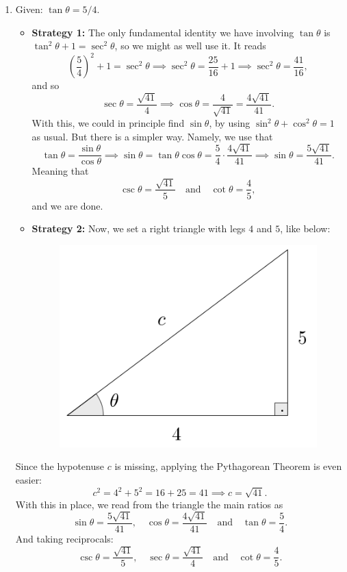 \documentclass{ximera}
\begin{document}
\begin{example}
\begin{enumerate}[label=\alph*.]
  \item Given: $\tan\theta = 5/4$.

    \begin{explanation}
      \begin{itemize}
      \item {\bf Strategy 1:} The only fundamental identity we have involving $\tan\theta$ is $\tan^2\theta+1=\sec^2\theta$, so we might as well use it. It reads $$\left(\frac{5}{4}\right)^2 + 1 = \sec^2\theta \implies \sec^2\theta = \frac{25}{16} + 1 \implies \sec^2\theta = \frac{41}{16},$$and so $$\sec\theta = \frac{\sqrt{41}}{4} \implies \cos\theta = \frac{4}{\sqrt{41}} = \frac{4\sqrt{41}}{41}.$$With this, we could in principle find $\sin\theta$, by using $\sin^2\theta+\cos^2\theta=1$ as usual. But there is a simpler way. Namely, we use that $$\tan\theta = \frac{\sin\theta}{\cos\theta} \implies \sin\theta = \tan\theta \cos\theta= \frac{5}{4}\cdot \frac{4\sqrt{41}}{41} \implies \sin\theta = \frac{5\sqrt{41}}{41}.$$Meaning that $$\csc\theta = \frac{\sqrt{41}}{5} \quad\mbox{and}\quad \cot\theta = \frac{4}{5},$$and we are done.
      \item {\bf Strategy 2:} Now, we set a right triangle with legs $4$ and $5$, like below:  \begin{figure}[h]
          \centering
          \includegraphics[scale=.3]{./figures/9-1-3-triangle-tan-5-4.png}
        \end{figure} 
      \end{itemize} Since the hypotenuse $c$ is missing, applying the Pythagorean Theorem is even easier: $$c^2 = 4^2+5^2 = 16+25=41\implies c=\sqrt{41}.$$With this in place, we read from the triangle the main ratios as $$\sin\theta=\frac{5\sqrt{41}}{41},\quad \cos\theta=\frac{4\sqrt{41}}{41}\quad\mbox{and}\quad\tan\theta=\frac{5}{4}.$$And taking reciprocals:$$\csc\theta=\frac{\sqrt{41}}{5},\quad \sec\theta=\frac{\sqrt{41}}{4}\quad\mbox{and}\quad\cot\theta=\frac{4}{5}.$$
    \end{explanation}
    

\end{enumerate}
\end{example}
\end{document}
